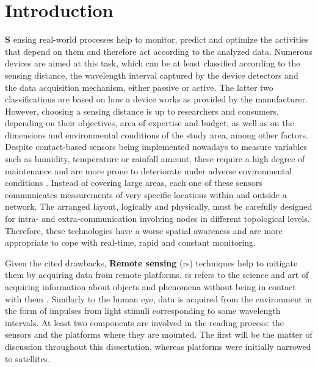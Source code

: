 \setchapterpreamble[u]{\margintoc}
\chapter{Introduction}

\lettrine[findent=0pt, lines=3]{\textbf{S}}{ }ensing real-world processes help to monitor, predict and optimize the activities that depend on them and therefore act according to the analyzed data. Numerous devices are aimed at this task, which can be at least classified according to the sensing distance, the wavelength interval captured by the device detectors and the data acquisition mechanism, either passive or active. The latter two classifications are based on how a device works as provided by the manufacturer. However, choosing a sensing distance is up to researchers and consumers, depending on their objectives, area of expertise and budget, as well as on the dimensions and environmental conditions of the study area, among other factors. Despite contact-based sensors being implemented nowadays to measure variables such as humidity, temperature or rainfall amount, these require a high degree of maintenance and are more prone to deteriorate under adverse environmental conditions \cite{silva_low-cost_2019, morais_versatile_2021}. Instead of covering large areas, each one of these sensors communicates measurements of very specific locations within and outside a network. The arranged layout, logically and physically, must be carefully designed for intra- and extra-communication involving nodes in different topological levels. Therefore, these technologies have a worse spatial awareness and are more appropriate to cope with real-time, rapid and constant monitoring. 

Given the cited drawbacks, \textbf{Remote sensing} (\acrshort{rs}) techniques help to mitigate them by acquiring data from remote platforms. \acrshort{rs} refers to the science and art of acquiring information about objects and phenomena without being in contact with them \cite{lillesand_remote_2015}. Similarly to the human eye, data is acquired from the environment in the form of impulses from light stimuli corresponding to some wavelength intervals. At least two components are involved in the reading process: the sensors and the platforms where they are mounted. The first will be the matter of discussion throughout this dissertation, whereas platforms were initially narrowed to satellites. 

